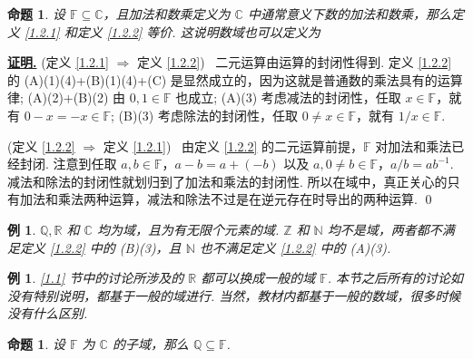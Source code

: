 \documentclass[10pt,openany]{article}
\theoremstyle{thmstyle} %
\theoremstyle{defstyle} %
\theoremstyle{prostyle} %
\newtheorem{proposition}[theorem]{命题}
\newtheorem{example}[theorem]{例}
\renewenvironment{proof}[1][证明]{\par\underline{\textbf{#1.}} \;\fangsong}{\qed\par}
\begin{document}
\begin{proposition}
	设 \( \mathbb{F} \subseteq \mathbb{C} \)，且加法和数乘定义为 \( \mathbb{C} \) 中通常意义下数的加法和数乘，那么定义 \ref{1.2.1} 和定义 \ref{1.2.2} 等价. 这说明数域也可以定义为
	\begin{center}
	\end{center}
\end{proposition}

\begin{proof}
	(定义 \ref{1.2.1}  \( \Rightarrow \) 定义 \ref{1.2.2}) \ 二元运算由运算的封闭性得到. 定义 \ref{1.2.2} 的 (A)(1)(4)+(B)(1)(4)+(C) 是显然成立的，因为这就是普通数的乘法具有的运算律; (A)(2)+(B)(2) 由 \( 0,1 \in \mathbb{F} \) 也成立; (A)(3) 考虑减法的封闭性，任取 \( x \in \mathbb{F} \)，就有 \( 0-x=-x \in \mathbb{F} \); (B)(3) 考虑除法的封闭性，任取 \( 0 \neq x \in \mathbb{F} \)，就有 \( 1/x \in \mathbb{F} \).
	
	\vspace{1ex}
	
	(定义 \ref{1.2.2}  \( \Rightarrow \) 定义 \ref{1.2.1}) \ 由定义 \ref{1.2.2} 的二元运算前提，\( \mathbb{F} \) 对加法和乘法已经封闭. 注意到任取 \( a,b \in \mathbb{F} \)，\( a-b=a+(-b) \) 以及 \( a, 0 \neq b \in \mathbb{F} \)，\( a/b=ab^{-1} \). 减法和除法的封闭性就划归到了加法和乘法的封闭性. 所以在域中，真正关心的只有加法和乘法两种运算，减法和除法不过是在逆元存在时导出的两种运算.
\end{proof}

\begin{example}
	\( \mathbb{Q}, \mathbb{R} \) 和 \( \mathbb{C} \) 均为域，且为有无限个元素的域. \( \mathbb{Z} \) 和 \( \mathbb{N} \) 均不是域，两者都不满足定义 \ref{1.2.2} 中的 (B)(3)，且 \( \mathbb{N} \) 也不满足定义 \ref{1.2.2} 中的 (A)(3).
\end{example}

\begin{example}
	\ref{1.1} 节中的讨论所涉及的 \( \mathbb{R} \) 都可以换成一般的域 \( \mathbb{F} \). 本节之后所有的讨论如没有特别说明，都基于一般的域进行. 当然，教材内都基于一般的数域，很多时候没有什么区别.
\end{example}

\begin{proposition}
	设 \( \mathbb{F} \) 为 \( \mathbb{C} \) 的子域，那么 \( \mathbb{Q} \subseteq \mathbb{F} \).
	\label{1.2.6}
\end{proposition}
\end{document}
